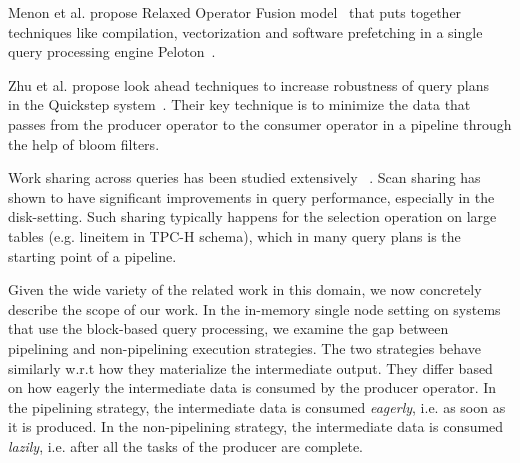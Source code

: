 Menon et al. propose Relaxed Operator Fusion model~\cite{rof} that puts together techniques like compilation, vectorization and software prefetching in a single query processing engine Peloton~\cite{pelotondb}. 

Zhu et al. propose look ahead techniques to increase robustness of query plans~\cite{zhu2017looking} in the Quickstep system~\cite{quickstep-vldb}.
Their key technique is to minimize the data that passes from the producer operator to the consumer operator in a pipeline through the help of bloom filters.

Work sharing across queries has been studied extensively ~\cite{DBLP:conf/sigmod/HarizopoulosSA05, DBLP:conf/vldb/ZukowskiHNB07}.
Scan sharing has shown to have significant improvements in query performance, especially in the disk-setting.
Such sharing typically happens for the selection operation on large tables (e.g. lineitem in TPC-H schema), which in many query plans is the starting point of a pipeline. 

Given the wide variety of the related work in this domain, we now concretely describe the scope of our work.
In the in-memory single node setting on systems that use the block-based query processing, we examine the gap between pipelining and non-pipelining execution strategies. 
The two strategies behave similarly w.r.t how they materialize the intermediate output.
They differ based on how eagerly the intermediate data is consumed by the producer operator. 
In the pipelining strategy, the intermediate data is consumed \textit{eagerly}, i.e. as soon as it is produced.
In the non-pipelining strategy, the intermediate data is consumed \textit{lazily}, i.e. after all the tasks of the producer are complete.

